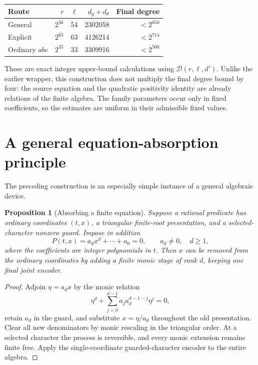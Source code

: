 \documentclass[11pt]{article}
\newtheorem{proposition}[theorem]{Proposition}
\begin{document}
\begin{center}
\begin{tabular}{lrrrr}
\toprule
Route & \(r\) & \(\ell\) & \(d_g+d_\theta\) & Final degree\\
\midrule
General &\(2^{56}\)&54&2302058&\(<2^{650}\)\\
Explicit &\(2^{65}\)&63&4126214&\(<2^{714}\)\\
Ordinary \(abc\)&\(2^{35}\)&33&3309916&\(<2^{500}\)\\
\bottomrule
\end{tabular}
\end{center}

These are exact integer upper-bound calculations using
\(\mathcal D(r,\ell,d')\).  Unlike the earlier wrapper, this construction
does not multiply the final degree bound by four: the source equation
and the quadratic positivity identity are already relations of the
finite algebra.  The family parameters occur only in fixed
coefficients, so the estimates are uniform in their admissible fixed
values.

\section{A general equation-absorption principle}

The preceding construction is an especially simple instance of a
general algebraic device.

\begin{proposition}[Absorbing a finite equation]\label{absorb}
Suppose a rational predicate has ordinary coordinates \((t,x)\),
a triangular finite-root presentation, and a selected-character
nonzero guard.  Impose in addition
\[
              P(t,x)=a_dx^d+\cdots+a_0=0,\qquad a_d\ne0,\quad d\ge1,
\]
where the coefficients are integer polynomials in \(t\).
Then \(x\) can be removed from the ordinary coordinates by adding a
finite monic stage of rank \(d\), keeping one final joint encoder.
\end{proposition}
\begin{proof}
Adjoin \(\eta=a_dx\) by the monic relation
\[
 \eta^d+\sum_{j=0}^{d-1}a_j a_d^{d-1-j}\eta^j=0,
\]
retain \(a_d\) in the guard, and substitute \(x=\eta/a_d\) throughout
the old presentation.  Clear all new denominators by monic rescaling
in the triangular order.  At a selected character the process is
reversible, and every monic extension remains finite free.  Apply the
single-coordinate guarded-character encoder to the entire algebra.
\end{proof}
\end{document}
